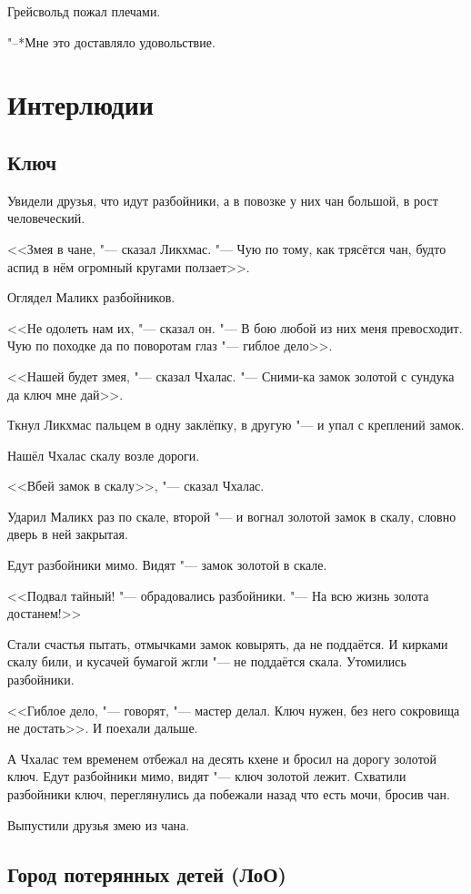 \documentclass[a4paper,10pt]{book}
\begin{document}
Грейсвольд пожал плечами.

"--*Мне это доставляло удовольствие.

\chapter{Интерлюдии}

\section{Ключ}

Увидели друзья, что идут разбойники, а в повозке у них чан большой, в рост человеческий.

<<Змея в чане, "--- сказал Ликхмас. "--- Чую по тому, как трясётся чан, будто аспид в нём огромный кругами ползает>>.

Оглядел Маликх разбойников.

<<Не одолеть нам их, "--- сказал он. "--- В бою любой из них меня превосходит. Чую по походке да по поворотам глаз "--- гиблое дело>>.

<<Нашей будет змея, "--- сказал Чхалас. "--- Сними-ка замок золотой с сундука да ключ мне дай>>.

Ткнул Ликхмас пальцем в одну заклёпку, в другую "--- и упал с креплений замок.

Нашёл Чхалас скалу возле дороги.

<<Вбей замок в скалу>>, "--- сказал Чхалас.

Ударил Маликх раз по скале, второй "--- и вогнал золотой замок в скалу, словно дверь в ней закрытая.

Едут разбойники мимо. Видят "--- замок золотой в скале. 

<<Подвал тайный! "--- обрадовались разбойники. "--- На всю жизнь золота достанем!>>

Стали счастья пытать, отмычками замок ковырять, да не поддаётся. И кирками скалу били, и кусачей бумагой жгли "--- не поддаётся скала. Утомились разбойники.

<<Гиблое дело, "--- говорят, "--- мастер делал. Ключ нужен, без него сокровища не достать>>. И поехали дальше.

А Чхалас тем временем отбежал на десять кхене и бросил на дорогу золотой ключ. Едут разбойники мимо, видят "--- ключ золотой лежит. Схватили разбойники ключ, переглянулись да побежали назад что есть мочи, бросив чан.

Выпустили друзья змею из чана.

\section{Город потерянных детей (ЛоО)}
\end{document}
